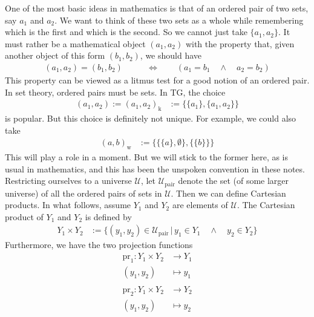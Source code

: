 One of the most basic ideas in mathematics is that of an ordered pair of two sets, say $a_{1}$ and $a_{2}$.
We want to think of these two sets as a whole while remembering which is the first and which is the second.
So we cannot just take $\lbrace a_{1},a_{2} \rbrace$.
It must rather be a mathematical object $(a_{1},a_{2})$ with the property that, given another object of this form $(b_{1},b_{2})$, we should have
\begin{align*}
  (a_{1},a_{2})
  =
  (b_{1},b_{2})
  \qquad
  &\Leftrightarrow
  \qquad
  \left(
    a_{1}
    =
    b_{1}
    \quad
    \land
    \quad
    a_{2}
    =
    b_{2}
  \right)
\end{align*}
This property can be viewed as a litmus test for a good notion of an ordered pair.
In set theory, ordered pairs must be sets.
In TG, the choice
\begin{align*}
  (a_{1},a_{2})
  :=
  (a_{1},a_{2})_{\textrm{k}}
  &:=
  \lbrace
    \lbrace
      a_{1}
    \rbrace,
    \lbrace
      a_{1},a_{2}
    \rbrace
  \rbrace
\end{align*}
is popular.
But this choice is definitely not unique.
For example, we could also take
\begin{align*}
  (a,b)_{\textrm{w}}
  &:=
  \lbrace
    \lbrace
      \lbrace
        a
      \rbrace,
      \emptyset
    \rbrace,
    \lbrace
      \lbrace
        b
      \rbrace
    \rbrace
  \rbrace
\end{align*}
This will play a role in a moment.
But we will stick to the former here, as is usual in mathematics, and this has been the unspoken convention in these notes.
\\
Restricting ourselves to a universe $\mathcal{U}$, let $\mathcal{U}_{\textrm{pair}}$ denote the set (of some larger universe) of all the ordered pairs of sets in $\mathcal{U}$.
Then we can define Cartesian products.
In what follows, assume $Y_{1}$ and $Y_{2}$ are elements of $\mathcal{U}$.
The Cartesian product of $Y_{1}$ and $Y_{2}$ is defined by
\begin{align*}
  Y_{1}
  \times
  Y_{2}
  &:=
  \lbrace
      (y_{1},y_{2})
      \in
      \mathcal{U}_{\textrm{pair}}
    \,
    \vert
    \,
      y_{1}
      \in
      Y_{1}
      \quad
      \land
      \quad
      y_{2}
      \in
      Y_{2}
  \rbrace
\end{align*}
Furthermore, we have the two projection functions
\begin{align*}
  \mathrm{pr}_{1}
  \colon
  Y_{1}
  \times
  Y_{2}
  &\rightarrow
  Y_{1}
  \\
  (y_{1},y_{2})
  &\mapsto
  y_{1}
  \\\\
  \mathrm{pr}_{2}
  \colon
  Y_{1}
  \times
  Y_{2}
  &\rightarrow
  Y_{2}
  \\
  (y_{1},y_{2})
  &\mapsto
  y_{2}
\end{align*}

